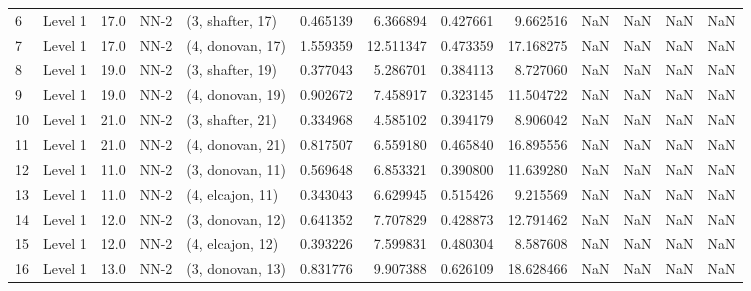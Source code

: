 \begin{tabular}{llrllrrrrrrrr}
6  &   Level 1 &   17.0 &        NN-2 &  (3, shafter, 17) &   0.465139 &   6.366894 &  0.427661 &   9.662516 &                  NaN &                    NaN &                 NaN &                   NaN \\
7  &   Level 1 &   17.0 &        NN-2 &  (4, donovan, 17) &   1.559359 &  12.511347 &  0.473359 &  17.168275 &                  NaN &                    NaN &                 NaN &                   NaN \\
8  &   Level 1 &   19.0 &        NN-2 &  (3, shafter, 19) &   0.377043 &   5.286701 &  0.384113 &   8.727060 &                  NaN &                    NaN &                 NaN &                   NaN \\
9  &   Level 1 &   19.0 &        NN-2 &  (4, donovan, 19) &   0.902672 &   7.458917 &  0.323145 &  11.504722 &                  NaN &                    NaN &                 NaN &                   NaN \\
10 &   Level 1 &   21.0 &        NN-2 &  (3, shafter, 21) &   0.334968 &   4.585102 &  0.394179 &   8.906042 &                  NaN &                    NaN &                 NaN &                   NaN \\
11 &   Level 1 &   21.0 &        NN-2 &  (4, donovan, 21) &   0.817507 &   6.559180 &  0.465840 &  16.895556 &                  NaN &                    NaN &                 NaN &                   NaN \\
12 &   Level 1 &   11.0 &        NN-2 &  (3, donovan, 11) &   0.569648 &   6.853321 &  0.390800 &  11.639280 &                  NaN &                    NaN &                 NaN &                   NaN \\
13 &   Level 1 &   11.0 &        NN-2 &  (4, elcajon, 11) &   0.343043 &   6.629945 &  0.515426 &   9.215569 &                  NaN &                    NaN &                 NaN &                   NaN \\
14 &   Level 1 &   12.0 &        NN-2 &  (3, donovan, 12) &   0.641352 &   7.707829 &  0.428873 &  12.791462 &                  NaN &                    NaN &                 NaN &                   NaN \\
15 &   Level 1 &   12.0 &        NN-2 &  (4, elcajon, 12) &   0.393226 &   7.599831 &  0.480304 &   8.587608 &                  NaN &                    NaN &                 NaN &                   NaN \\
16 &   Level 1 &   13.0 &        NN-2 &  (3, donovan, 13) &   0.831776 &   9.907388 &  0.626109 &  18.628466 &                  NaN &                    NaN &                 NaN &                   NaN \\

\end{tabular}

